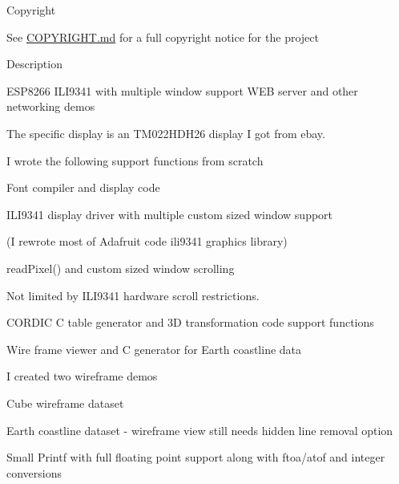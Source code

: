 \begin{DoxyParagraph}{Copyright}

\begin{DoxyItemize}
\item See \hyperlink{md_COPYRIGHT}{C\-O\-P\-Y\-R\-I\-G\-H\-T.md} for a full copyright notice for the project
\end{DoxyItemize}
\end{DoxyParagraph}
\begin{DoxyParagraph}{Description}

\begin{DoxyItemize}
\item E\-S\-P8266 I\-L\-I9341 with multiple window support W\-E\-B server and other networking demos
\begin{DoxyItemize}
\item The specific display is an T\-M022\-H\-D\-H26 display I got from ebay.
\end{DoxyItemize}
\item I wrote the following support functions from scratch
\begin{DoxyItemize}
\item Font compiler and display code
\item I\-L\-I9341 display driver with multiple custom sized window support
\begin{DoxyItemize}
\item (I rewrote most of Adafruit code ili9341 graphics library)
\item read\-Pixel() and custom sized window scrolling
\item Not limited by I\-L\-I9341 hardware scroll restrictions.
\end{DoxyItemize}
\item C\-O\-R\-D\-I\-C C table generator and 3\-D transformation code support functions
\item Wire frame viewer and C generator for Earth coastline data
\begin{DoxyItemize}
\item I created two wireframe demos
\begin{DoxyItemize}
\item Cube wireframe dataset
\item Earth coastline dataset -\/ wireframe view still needs hidden line removal option
\end{DoxyItemize}
\end{DoxyItemize}
\item Small Printf with full floating point support along with ftoa/atof and integer conversions

\end{DoxyItemize}
\end{DoxyItemize}
\end{DoxyParagraph}
